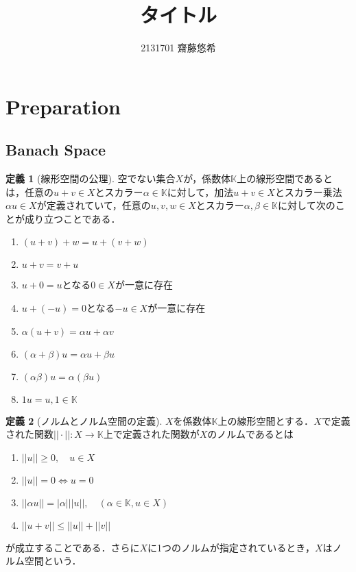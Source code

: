 \documentclass[11pt,a4paper]{jsarticle}
\theoremstyle{definition}
\newtheorem{dfn}{定義}
\begin{document}
\pagestyle{plain}
\title{タイトル}
\author{2131701 齋藤悠希}
\date{}\maketitle

\tableofcontents
\clearpage

\section{Preparation}
\subsection{Banach Space}
\begin{dfn}[線形空間の公理]
  \label{dfn:線形空間の公理}
  空でない集合$X$が，係数体$\mathbb{K}$上の線形空間であるとは，任意の$u+v \in X$とスカラー$\alpha \in \mathbb{K}$に対して，加法$u+v \in X$とスカラー乗法$\alpha u \in X$が定義されていて，任意の$u,v,w \in X$とスカラー$\alpha, \beta \in \mathbb{K}$に対して次のことが成り立つことである．
  \begin{enumerate}
    \item $(u+v)+w=u+(v+w)$
    \item $u+v=v+u$
    \item $u+0=u$となる$0 \in X$が一意に存在
    \item $u+(-u)=0$となる$-u\in X$が一意に存在
    \item $\alpha(u+v)=\alpha u+\alpha v$
    \item $(\alpha +\beta)u = \alpha u+\beta u$
    \item $(\alpha \beta)u = \alpha (\beta u)$
    \item $1u=u, 1 \in \mathbb{K}$
  \end{enumerate}
\end{dfn}

\begin{dfn}[ノルムとノルム空間の定義]
  $X$を係数体$\mathbb{K}$上の線形空間とする．$X$で定義された関数$||\cdot||:X\rightarrow \mathbb{K}$上で定義された関数が$X$のノルムであるとは
  \begin{enumerate}
    \item $||u||\geq 0, \quad u \in X$
    \item $||u||=0 \Leftrightarrow u=0$
    \item $||\alpha u||=|\alpha| ||u||, \quad (\alpha \in \mathbb{K}, u \in X)$
    \item $||u+v||\leq ||u||+||v||$
  \end{enumerate}
  が成立することである．さらに$X$に1つのノルムが指定されているとき，$X$はノルム空間という．
\end{dfn}
\end{document}

